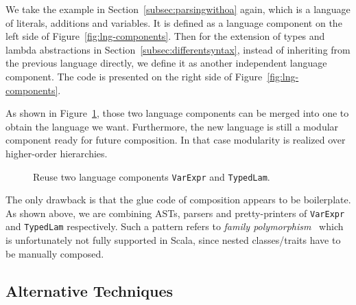 We take the example in Section~\ref{subsec:parsingwithoa} again, which is a language of literals, additions and variables. It is defined as a
language component on the left side of Figure~\ref{fig:lng-components}.
Then for the extension of types and lambda abstractions in Section~\ref{subsec:differentsyntax}, instead of inheriting from the previous language directly, we define it as another independent language component. The code is presented on the right side of Figure~\ref{fig:lng-components}.


As shown in Figure~\ref{fig:compose-components}, those two language components can be merged into one to obtain the language we want. Furthermore, the new language is still a modular
component ready for future composition. In that case modularity is realized over higher-order hierarchies.

\begin{figure}[t]
\caption{Reuse two language components \lstinline{VarExpr} and \lstinline{TypedLam}.}\label{fig:compose-components}
\end{figure}

The only drawback is that the glue code of composition appears to be
boilerplate. As shown above, we are combining ASTs, parsers and
pretty-printers of \lstinline{VarExpr} and \lstinline{TypedLam}
respectively. Such a pattern refers to \textit{family
  polymorphism}~\cite{ernst01FP} which is unfortunately not fully supported
in Scala, since nested classes/traits have to be manually composed.

\subsection{Alternative Techniques}

